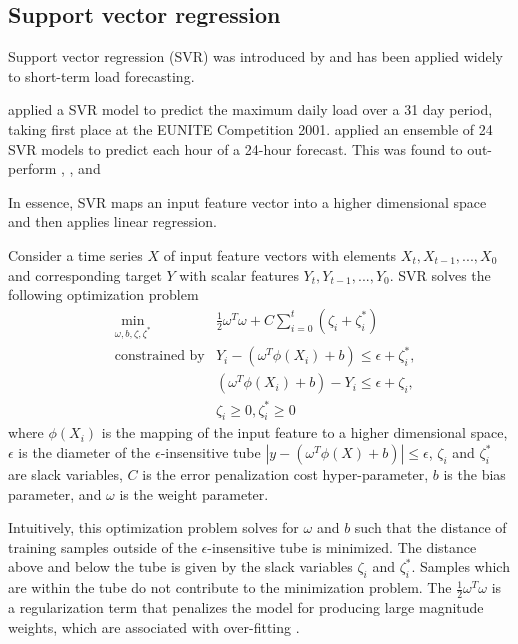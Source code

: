 \subsection{Support vector regression}
Support vector regression (SVR) was introduced by \citet{Drucker1996} and has been applied widely to short-term load forecasting.
\par
\citet{Chen2004} applied a SVR model to predict the maximum daily load over a 31 day period, taking first place at the EUNITE Competition 2001.
\citet{Ceperic2013} applied an ensemble of 24 SVR models to predict each hour of a 24-hour forecast.
This was found to out-perform \citet{RochaReis2005}, \citet{AMJADY2009}, and \citet{Deihimi2012}
\par
In essence, SVR maps an input feature vector into a higher dimensional space and then applies linear regression.
\par
Consider a time series $X$ of input feature vectors with elements $X_{t}, X_{t-1}, ..., X_{0}$ and corresponding target $Y$ with scalar features $Y_{t}, Y_{t-1}, ..., Y_{0}$. SVR solves the following optimization problem
\begin{align}
& \min\limits_{\omega,b,\zeta,\zeta^{*}} & \frac{1}{2}\omega^T\omega + C\sum_{i=0}^{t}(\zeta_i+\zeta_i^*) \\
& \text{constrained by} & Y_i - (\omega^T\phi(X_i) + b) \leq \epsilon + \zeta_i^*,	\nonumber \\
                       && (\omega^T\phi(X_i)+b)-Y_i\leq\epsilon+\zeta_i,	\nonumber \\
                       && \zeta_i \geq 0, \zeta_i^* \geq 0 \nonumber
\end{align}
where $\phi(X_i)$ is the mapping of the input feature to a higher dimensional space, $\epsilon$ is the diameter of the $\epsilon$-insensitive tube $|y - (\omega^T\phi(X) + b)| \leq \epsilon$, $\zeta_i$ and $\zeta_i^*$ are slack variables, $C$ is the error penalization cost hyper-parameter, $b$ is the bias parameter, and $\omega$ is the weight parameter.
\par
Intuitively, this optimization problem solves for $\omega$ and  $b$ such that the distance of training samples outside of the $\epsilon$-insensitive tube is minimized. The distance above and below the tube is given by the slack variables $\zeta_i$ and $\zeta_i^*$. Samples which are within the tube do not contribute to the minimization problem. The $\frac{1}{2}\omega^T\omega$ is a regularization term that penalizes the model for producing large magnitude weights, which are associated with over-fitting \citep{Drucker1996}.
